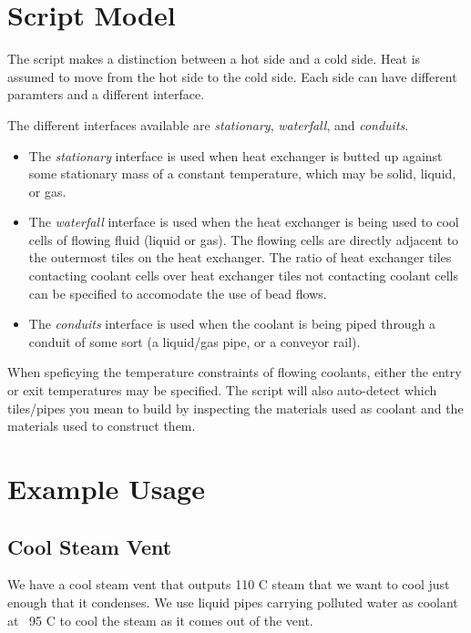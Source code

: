 \documentclass{article}
\numberwithin{equation}{subsection}
\theoremstyle{remark}
\begin{document}
\section{Script Model}

The script makes a distinction between a hot side and a cold side.
Heat is assumed to move from the hot side to the cold side.
Each side can have different paramters and a different interface.

The different interfaces available are \emph{stationary}, \emph{waterfall}, and \emph{conduits}.

\begin{itemize}
\item The \emph{stationary} interface is used when heat exchanger is butted up against some stationary mass of a constant temperature, which may be solid, liquid, or gas.

\item The \emph{waterfall} interface is used when the heat exchanger is being used to cool cells of flowing fluid (liquid or gas).
The flowing cells are directly adjacent to the outermost tiles on the heat exchanger.
The ratio of heat exchanger tiles contacting coolant cells over heat exchanger tiles not contacting coolant cells can be specified to accomodate the use of bead flows.

\item The \emph{conduits} interface is used when the coolant is being piped through a conduit of some sort (a liquid/gas pipe, or a conveyor rail).
\end{itemize}

When speficying the temperature constraints of flowing coolants, either the entry or exit temperatures may be specified.
The script will also auto-detect which tiles/pipes you mean to build by inspecting the materials used as coolant and the materials used to construct them.

\section{Example Usage}

\subsection{Cool Steam Vent}

We have a cool steam vent that outputs 110 \degree{}C steam that we want to cool just enough that it condenses.  We use liquid pipes carrying polluted water as coolant at ~95 \degree{}C to cool the steam as it comes out of the vent.
\end{document}

